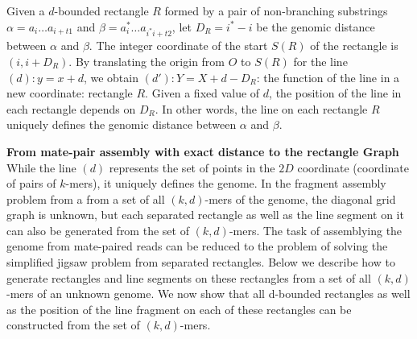 \documentclass[a4paper]{article}
\begin{document}
Given a $d$-bounded rectangle $R$ formed by a pair of non-branching substrings $\alpha = a_i\ldots a_{i+t1}$
and $\beta = a_i^*\ldots a_{i^*i+ t2}$, let $D_R= i^* - i$ be the genomic distance between $\alpha$ and $\beta$. The integer 
coordinate of the start $S(R)$ of the rectangle is $(i, i + D_R)$. By translating the origin from  $O$ to $S(R)$ for the line
$(d): y = x + d$, we obtain $(d'): Y = X + d - D_R$: the function of the line in a new coordinate: rectangle $R$. Given a fixed
value of $d$, the position of the line in each rectangle depends on $D_R$. In other words, the line on each rectangle $R$ 
uniquely defines the genomic distance between $\alpha$ and $\beta$. 


\noindent
\textbf{From mate-pair assembly with exact distance to the rectangle Graph}
While the line $(d)$ represents the 
set of points in the $2D$ coordinate (coordinate of pairs of $k$-mers), it uniquely defines the genome.
In the fragment assembly problem from a from a set of all $(k,d)$-mers of the genome, 
the diagonal grid graph is unknown, but each separated rectangle as well 
as the line segment on it can also be generated
from the set of $(k,d)$-mers. The task of assemblying the genome from mate-paired reads can be 
reduced to the problem of solving the simplified jigsaw problem from separated rectangles. Below we describe how
to generate rectangles and line segments on these rectangles from a set of all $(k,d)$-mers of an unknown genome. We now 
show that all d-bounded rectangles as well as the position of the line fragment on each of these rectangles can be constructed from 
the set of $(k,d)$-mers. 


\end{document}
